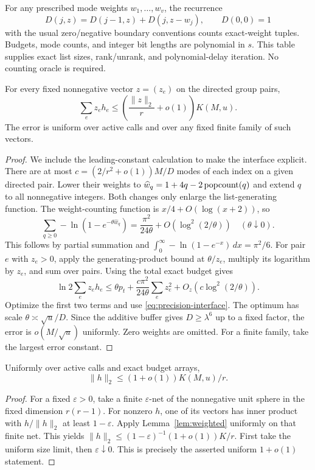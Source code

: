 For any prescribed mode weights $w_1,\ldots,w_v$, the recurrence
\[
 D(j,z)=D(j-1,z)+D(j,z-w_j),\qquad D(0,0)=1
\]
with the usual zero/negative boundary conventions counts exact-weight
tuples. Budgets, mode counts, and integer bit lengths are polynomial
in $s$. This table supplies exact list sizes, rank/unrank, and
polynomial-delay iteration. No counting oracle is required.

\begin{lemma}\label{lem:weighted}
For every fixed nonnegative vector $z=(z_e)$ on the directed group pairs,
\begin{equation}
 \sum_e z_e h_e
 \le \left(\frac{\|z\|_2}{r}+o(1)\right)K(M,u).
 \label{eq:weighted}
\end{equation}
The error is uniform over active calls and over any fixed finite family
of such vectors.
\end{lemma}
\begin{proof}
We include the leading-constant calculation to make the interface explicit.
There are at most
$c=(2/r^2+o(1))M/D$ modes of each index on a given directed pair.
Lower their weights to
$\widehat w_q=1+4q-2\operatorname{popcount}(q)$ and extend $q$ to all nonnegative integers.
Both changes only enlarge the list-generating function.
The weight-counting function is $x/4+O(\log(x+2))$, so
\[
 \sum_{q\ge0}-\ln(1-e^{-\theta\widehat w_q})
 =\frac{\pi^2}{24\theta}+O(\log^2(2/\theta))
 \quad(\theta\downarrow0).
\]
This follows by partial summation and
$\int_0^\infty-\ln(1-e^{-x})\,dx=\pi^2/6$.
For pair $e$ with $z_e>0$, apply the generating-product bound at
$\theta/z_e$, multiply its logarithm by $z_e$, and sum over pairs.
Using the total exact budget gives
\[
 \ln2\sum_e z_eh_e
 \le \theta p_t+
 \frac{c\pi^2}{24\theta}\sum_e z_e^2+
 O_z(c\log^2(2/\theta)).
\]
Optimize the first two terms and use
\eqref{eq:precision-interface}. The optimum has scale
$\theta\asymp\sqrt u/D$. Since the additive buffer gives
$D\ge\lambda^6$ up to a fixed factor, the error is
$o(M/\sqrt u)$ uniformly. Zero weights are omitted.
For a finite family, take the largest error constant.
\end{proof}

\begin{corollary}\label{cor:l2}
Uniformly over active calls and exact budget arrays,
\[
 \|h\|_2\le(1+o(1))K(M,u)/r.
\]
\end{corollary}
\begin{proof}
For a fixed $\varepsilon>0$, take a finite $\varepsilon$-net of the
nonnegative unit sphere in the fixed dimension $r(r-1)$.
For nonzero $h$, one of its vectors has inner product with
$h/\|h\|_2$ at least $1-\varepsilon$.
Apply Lemma~\ref{lem:weighted} uniformly on that finite net.
This yields $\|h\|_2\le(1-\varepsilon)^{-1}(1+o(1))K/r$.
First take the uniform size limit, then $\varepsilon\downarrow0$.
This is precisely the asserted uniform $1+o(1)$ statement.
\end{proof}

